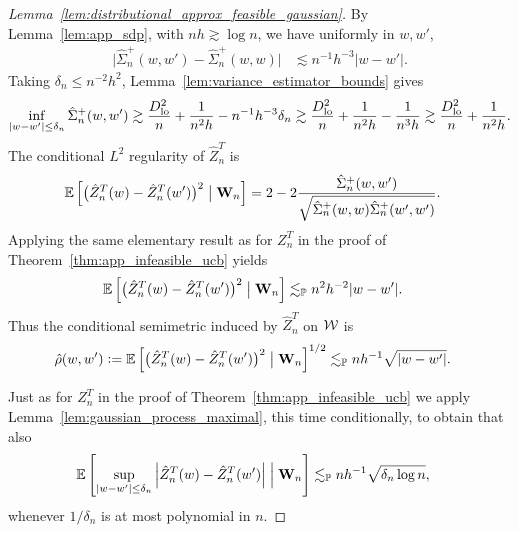 \begin{proof}[Lemma~\ref{lem:distributional_approx_feasible_gaussian}]
  By Lemma~\ref{lem:app_sdp},
  with $n h \gtrsim \log n$,
  we have
  uniformly in $w,w'$,
  \begin{align*}
    \big|
    \hat \Sigma_n^+(w,w')
    - \hat \Sigma_n^+(w,w)
    \big|
    &\lesssim
    n^{-1} h^{-3} |w-w'|.
  \end{align*}
  Taking
  $\delta_n \leq n^{-2} h^2$,
  Lemma~\ref{lem:variance_estimator_bounds}
  gives
  \begin{align*}
    \inf_{|w-w'| \leq \delta_n}
    \hat \Sigma_n^+(w,w')
    \gtrsim
    \frac{D_{\textup{lo}}^2}{n}
    + \frac{1}{n^2h}
    - n^{-1} h^{-3} \delta_n
    \gtrsim
    \frac{D_{\textup{lo}}^2}{n}
    + \frac{1}{n^2h}
    - \frac{1}{n^3h}
    \gtrsim
    \frac{D_{\textup{lo}}^2}{n}
    + \frac{1}{n^2h}.
  \end{align*}
  The conditional $L^2$
  regularity of $\hat Z_n^T$ is
  \begin{align*}
    \mathbb{E}\left[
      \big(
        \hat Z_n^T(w) - \hat Z_n^T(w')
      \big)^2
      \bigm\vert \mathbf{W}_n
    \right]
    &=
    2 - 2
    \frac{\hat \Sigma_n^+(w,w')}
    {\sqrt{\hat \Sigma_n^+(w,w) \hat \Sigma_n^+(w',w')}}.
  \end{align*}
  Applying the same elementary result as for $Z_n^T$
  in the proof of Theorem~\ref{thm:app_infeasible_ucb} yields
  \begin{align*}
    \mathbb{E}\left[
      \big(
        \hat Z_n^T(w) - \hat Z_n^T(w')
      \big)^2
      \bigm\vert \mathbf{W}_n
    \right]
    &\lesssim_{\mathbb{P}}
    n^2 h^{-2} |w-w'|.
  \end{align*}
  Thus the conditional semimetric
  induced by $\hat Z_n^T$ on $\mathcal{W}$ is
  \begin{align*}
    \hat\rho(w,w')
    &\vcentcolon=
    \mathbb{E}\left[
      \big(
        \hat Z_n^T(w) - \hat Z_n^T(w')
      \big)^2
      \bigm\vert \mathbf{W}_n
    \right]^{1/2}
    \lesssim_{\mathbb{P}}
    n h^{-1} \sqrt{|w-w'|}.
  \end{align*}


  Just as for $Z_n^T$
  in the proof of Theorem~\ref{thm:app_infeasible_ucb}
  we apply Lemma~\ref{lem:gaussian_process_maximal},
  this time conditionally,
  to obtain that also
  \begin{align*}
    \mathbb{E}\left[
      \sup_{|w-w'| \leq \delta_n}
      \left| \hat Z_n^T(w) - \hat Z_n^T(w') \right|
      \Bigm\vert \mathbf{W}_n
    \right]
    &\lesssim_{\mathbb{P}}
    n h^{-1}
    \sqrt{\delta_n \log n},
  \end{align*}
  whenever $1/\delta_n$
  is at most polynomial in $n$.


\end{proof}
